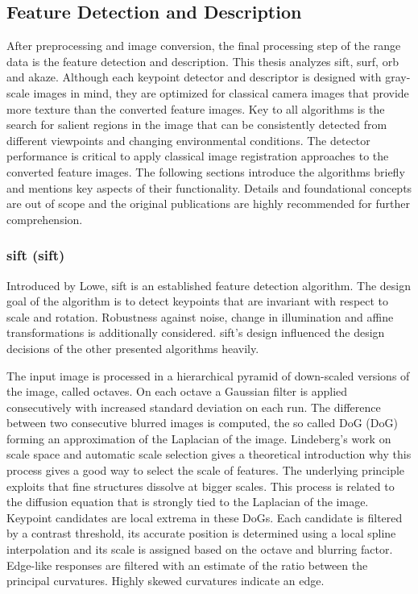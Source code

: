 \subsection{Feature Detection and Description}\label{sec:feature_algorithms}

After preprocessing and image conversion, the final processing step of the range data is the feature detection and description.
This thesis analyzes \acrshort{sift}\cite{lowe_ijcv04}, \acrshort{surf}\cite{bay_eccv06}, \acrshort{orb}\cite{rublee_iccv11} and \acrshort{akaze}\cite{alcantarilla_bmva13}.
Although each keypoint detector and descriptor is designed with gray-scale images in mind, they are optimized for classical camera images that provide more texture than the converted feature images.
Key to all algorithms is the search for salient regions in the image that can be consistently detected from different viewpoints and changing environmental conditions.
The detector performance is critical to apply classical image registration approaches to the converted feature images.
The following sections introduce the algorithms briefly and mentions key aspects of their functionality.
Details and foundational concepts are out of scope and the original publications are highly recommended for further comprehension.

\subsubsection{\acrshort{sift} (\acrlong{sift})}

Introduced by Lowe\cite{lowe_iccv99,lowe_ijcv04}, \acrshort{sift} is an established feature detection algorithm.
The design goal of the algorithm is to detect keypoints that are invariant with respect to scale and rotation.
Robustness against noise, change in illumination and affine transformations is additionally considered.
\acrshort{sift}'s design influenced the design decisions of the other presented algorithms heavily.

The input image is processed in a hierarchical pyramid of down-scaled versions of the image, called octaves.
On each octave a Gaussian filter is applied consecutively with increased standard deviation on each run.
The difference between two consecutive blurred images is computed, the so called \acrlong{DoG} (\acrshort{DoG}) forming an approximation of the Laplacian of the image.
Lindeberg's\cite{lindeberg_ijcv98} work on scale space and automatic scale selection gives a theoretical introduction why this process gives a good way to select the scale of features.
The underlying principle exploits that fine structures dissolve at bigger scales.
This process is related to the diffusion equation that is strongly tied to the Laplacian of the image.
Keypoint candidates are local extrema in these \acrshort{DoG}s.
Each candidate is filtered by a contrast threshold, its accurate position is determined using a local spline interpolation and its scale is assigned based on the octave and blurring factor.
Edge-like responses are filtered with an estimate of the ratio between the principal curvatures.
Highly skewed curvatures indicate an edge.

